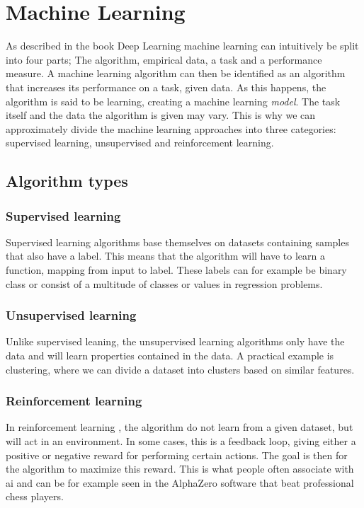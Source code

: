     
    
    
\clearpage
\section{Machine Learning} \label{Machine Learning}
    As described in the book Deep Learning\cite{Goodfellow-et-al-2016_ML} machine learning can intuitively be split into four parts; The algorithm, empirical data, a task and a performance measure. A machine learning algorithm can then be identified as an algorithm that increases its performance on a task, given data. As this happens, the algorithm is said to be learning, creating a machine learning \textit{model}. The task itself and the data the algorithm is given may vary. This is why we can approximately divide the machine learning approaches into three categories\cite{Goodfellow-et-al-2016_E}: supervised learning, unsupervised and reinforcement learning. 
    
    \subsection{Algorithm types} \label{Algorithm types}
        \subsubsection{Supervised learning}
            Supervised learning \cite{Goodfellow-et-al-2016_E} algorithms base themselves on datasets containing samples that also have a label. This means that the algorithm will have to learn a function, mapping from input to label. These labels can for example be binary class or consist of a multitude of classes or values in regression problems.
            
        \subsubsection{Unsupervised learning}
            Unlike supervised leaning, the unsupervised learning \cite{Goodfellow-et-al-2016_E} algorithms only have the data and will learn properties contained in the data. A practical example is clustering, where we can divide a dataset into clusters based on similar features. 
                
        \subsubsection{Reinforcement learning}
            In reinforcement learning \cite{Goodfellow-et-al-2016_E}, the algorithm do not learn from a given dataset, but will act in an environment. In some cases, this is a feedback loop, giving either a positive or negative reward for performing certain actions. The goal is then for the algorithm to maximize this reward. This is what people often associate with \gls{ai} and can be for example seen in the AlphaZero software that beat professional chess players\cite{silver2017mastering}.
    
